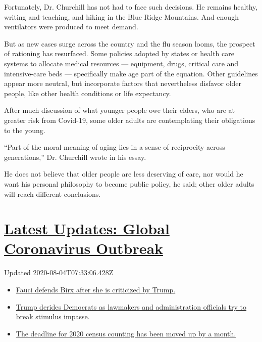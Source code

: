 Fortunately, Dr. Churchill has not had to face such decisions. He
remains healthy, writing and teaching, and hiking in the Blue Ridge
Mountains. And enough ventilators were produced to meet demand.

But as new cases surge across the country and the flu season looms, the
prospect of rationing has resurfaced. Some policies adopted by states or
health care systems to allocate medical resources --- equipment, drugs,
critical care and intensive-care beds --- specifically make age part of
the equation. Other guidelines appear more neutral, but incorporate
factors that nevertheless disfavor older people, like other health
conditions or life expectancy.

After much discussion of what younger people owe their elders, who are
at greater risk from Covid-19, some older adults are contemplating their
obligations to the young.

``Part of the moral meaning of aging lies in a sense of reciprocity
across generations,'' Dr. Churchill wrote in his essay.

He does not believe that older people are less deserving of care, nor
would he want his personal philosophy to become public policy, he said;
other older adults will reach different conclusions.

\hypertarget{latest-updates-global-coronavirus-outbreak}{%
\section{\texorpdfstring{\href{https://www.nytimes3xbfgragh.onion/2020/08/03/world/coronavirus-covid-19.html?action=click\&pgtype=Article\&state=default\&region=MAIN_CONTENT_1\&context=storylines_live_updates}{Latest
Updates: Global Coronavirus
Outbreak}}{Latest Updates: Global Coronavirus Outbreak}}\label{latest-updates-global-coronavirus-outbreak}}

Updated 2020-08-04T07:33:06.428Z

\begin{itemize}
\tightlist
\item
  \href{https://www.nytimes3xbfgragh.onion/2020/08/03/world/coronavirus-covid-19.html?action=click\&pgtype=Article\&state=default\&region=MAIN_CONTENT_1\&context=storylines_live_updates\#link-4547638f}{Fauci
  defends Birx after she is criticized by Trump.}
\item
  \href{https://www.nytimes3xbfgragh.onion/2020/08/03/world/coronavirus-covid-19.html?action=click\&pgtype=Article\&state=default\&region=MAIN_CONTENT_1\&context=storylines_live_updates\#link-15e7f995}{Trump
  derides Democrats as lawmakers and administration officials try to
  break stimulus impasse.}
\item
  \href{https://www.nytimes3xbfgragh.onion/2020/08/03/world/coronavirus-covid-19.html?action=click\&pgtype=Article\&state=default\&region=MAIN_CONTENT_1\&context=storylines_live_updates\#link-e5a2cda}{The
  deadline for 2020 census counting has been moved up by a month.}
\end{itemize}

